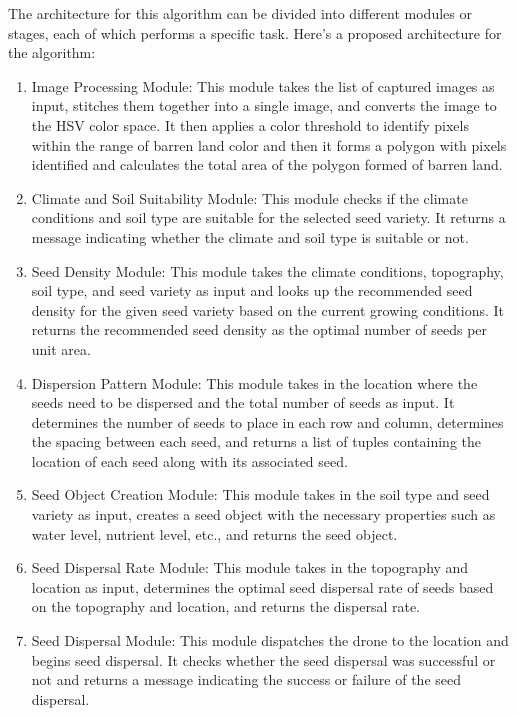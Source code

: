 \documentclass[conference]{IEEEtran}
\begin{document}
The architecture for this algorithm can be divided into different modules or stages, each of which performs a specific task. Here's a proposed architecture for the algorithm:
\begin{enumerate}
\item Image Processing Module: This module takes the list of captured images as input, stitches them together into a single image, and converts the image to the HSV color space. It then applies a color threshold to identify pixels within the range of barren land color and then it forms a polygon with pixels identified and calculates the total area of the polygon formed of barren land.

\item Climate and Soil Suitability Module: This module checks if the climate conditions and soil type are suitable for the selected seed variety. It returns a message indicating whether the climate and soil type is suitable or not.

\item Seed Density Module: This module takes the climate conditions, topography, soil type, and seed variety as input and looks up the recommended seed density for the given seed variety based on the current growing conditions. It returns the recommended seed density as the optimal number of seeds per unit area.

\item Dispersion Pattern Module: This module takes in the location where the seeds need to be dispersed and the total number of seeds as input. It determines the number of seeds to place in each row and column, determines the spacing between each seed, and returns a list of tuples containing the location of each seed along with its associated seed.

\item Seed Object Creation Module: This module takes in the soil type and seed variety as input, creates a seed object with the necessary properties such as water level, nutrient level, etc., and returns the seed object.

\item Seed Dispersal Rate Module: This module takes in the topography and location as input, determines the optimal seed dispersal rate of seeds based on the topography and location, and returns the dispersal rate.

\item Seed Dispersal Module: This module dispatches the drone to the location and begins seed dispersal. It checks whether the seed dispersal was successful or not and returns a message indicating the success or failure of the seed dispersal.
\end{enumerate}
\end{document}
